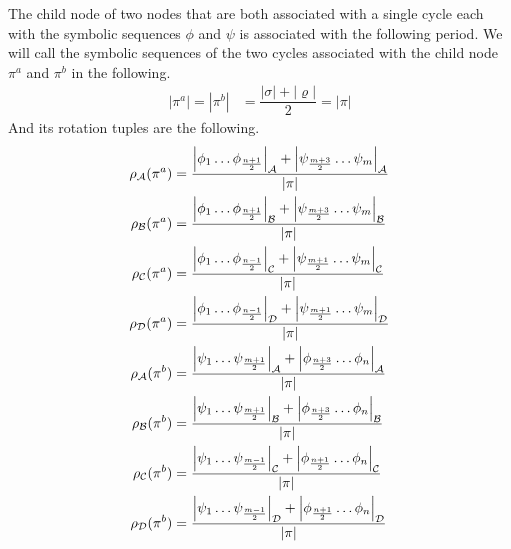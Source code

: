 \begin{theorem}
	The child node of two nodes that are both associated with a single cycle each with the symbolic sequences $\phi$ and $\psi$ is associated with the following period.
	We will call the symbolic sequences of the two cycles associated with the child node $\pi^a$ and $\pi^b$ in the following.
	\begin{align*}
		|\pi^a| = |\pi^b| & = \dfrac{|\sigma| + |\varrho|}{2} = |\pi|
	\end{align*}
	And its rotation tuples are the following.
	\begin{align*}
		\rho_{\mathcal{A}}(\pi^a) & = \dfrac{\left|\phi_1 \dots \phi_{\frac{n+1}{2}}\right|_{\mathcal{A}} + \left|\psi_{\frac{m+3}{2}} \dots \psi_m\right|_{\mathcal{A}}}{|\pi|} \\
		\rho_{\mathcal{B}}(\pi^a) & = \dfrac{\left|\phi_1 \dots \phi_{\frac{n+1}{2}}\right|_{\mathcal{B}} + \left|\psi_{\frac{m+3}{2}} \dots \psi_m\right|_{\mathcal{B}}}{|\pi|} \\
		\rho_{\mathcal{C}}(\pi^a) & = \dfrac{\left|\phi_1 \dots \phi_{\frac{n-1}{2}}\right|_{\mathcal{C}} + \left|\psi_{\frac{m+1}{2}} \dots \psi_m\right|_{\mathcal{C}}}{|\pi|} \\
		\rho_{\mathcal{D}}(\pi^a) & = \dfrac{\left|\phi_1 \dots \phi_{\frac{n-1}{2}}\right|_{\mathcal{D}} + \left|\psi_{\frac{m+1}{2}} \dots \psi_m\right|_{\mathcal{D}}}{|\pi|} \\
		\rho_{\mathcal{A}}(\pi^b) & = \dfrac{\left|\psi_1 \dots \psi_{\frac{m+1}{2}}\right|_{\mathcal{A}} + \left|\phi_{\frac{n+3}{2}} \dots \phi_n\right|_{\mathcal{A}}}{|\pi|} \\
		\rho_{\mathcal{B}}(\pi^b) & = \dfrac{\left|\psi_1 \dots \psi_{\frac{m+1}{2}}\right|_{\mathcal{B}} + \left|\phi_{\frac{n+3}{2}} \dots \phi_n\right|_{\mathcal{B}}}{|\pi|} \\
		\rho_{\mathcal{C}}(\pi^b) & = \dfrac{\left|\psi_1 \dots \psi_{\frac{m-1}{2}}\right|_{\mathcal{C}} + \left|\phi_{\frac{n+1}{2}} \dots \phi_n\right|_{\mathcal{C}}}{|\pi|} \\
		\rho_{\mathcal{D}}(\pi^b) & = \dfrac{\left|\psi_1 \dots \psi_{\frac{m-1}{2}}\right|_{\mathcal{D}} + \left|\phi_{\frac{n+1}{2}} \dots \phi_n\right|_{\mathcal{D}}}{|\pi|}
	\end{align*}
\end{theorem}

